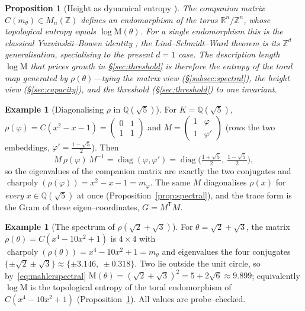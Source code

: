 \documentclass[11pt]{article}
\theoremstyle{plain}
\newtheorem{proposition}[theorem]{Proposition}
\theoremstyle{definition}
\newtheorem{example}[theorem]{Example}
\theoremstyle{remark}
\newcommand{\Q}{\mathbb{Q}}
\newcommand{\Z}{\mathbb{Z}}
\newcommand{\R}{\mathbb{R}}
\newcommand{\K}{K}
\newcommand{\charpoly}{\operatorname{charpoly}}
\newcommand{\Mah}{\mathrm{M}}
\newcommand{\GG}{G}
\newcommand{\transpose}{^{\mathsf{T}}}
\newcommand{\inv}{^{-1}}
\DeclareMathOperator{\diag}{diag}
\begin{document}
\begin{proposition}[Height as dynamical entropy {\cite{Yuzvinskii,LSW}}]\label{prop:lsw}
The companion matrix $C(m_\theta)\in M_n(\Z)$ defines an endomorphism of the torus $\R^n/\Z^n$, whose
topological entropy equals $\log\Mah(\theta)$. For a single endomorphism this is the classical
Yuzvinskii--Bowen identity \cite{Yuzvinskii}; the Lind--Schmidt--Ward theorem \cite{LSW} is its $\Z^d$
generalisation, specialising to the present $d=1$ case. The description length $\log\Mah$ that prices growth
in \S\ref{sec:threshold} is therefore the entropy of the toral map generated by $\rho(\theta)$---tying the
matrix view (\S\ref{subsec:spectral}), the height view (\S\ref{sec:capacity}), and the threshold
(\S\ref{sec:threshold}) to one invariant.
\end{proposition}

\begin{example}[Diagonalising $\rho$ in $\Q(\sqrt5)$]\label{ex:spectral}
For $\K=\Q(\sqrt5)$, $\rho(\varphi)=C(x^2-x-1)=\left(\begin{smallmatrix}0&1\\1&1\end{smallmatrix}\right)$ and
$M=\left(\begin{smallmatrix}1&\varphi\\1&\varphi'\end{smallmatrix}\right)$ (rows the two embeddings, $\varphi'=\tfrac{1-\sqrt5}2$). Then
\[
  M\,\rho(\varphi)\,M\inv=\diag(\varphi,\varphi')=\diag\!\Big(\tfrac{1+\sqrt5}2,\ \tfrac{1-\sqrt5}2\Big),
\]
so the eigenvalues of the companion matrix are exactly the two conjugates and
$\charpoly(\rho(\varphi))=x^2-x-1=m_\varphi$. The same $M$ diagonalises $\rho(x)$ for \emph{every}
$x\in\Q(\sqrt5)$ at once (Proposition~\ref{prop:spectral}), and the trace form is the Gram of these
eigen--coordinates, $\GG=M\transpose M$.
\end{example}

\begin{example}[The spectrum of $\rho(\sqrt2+\sqrt3)$]\label{ex:spectral4}
For $\theta=\sqrt2+\sqrt3$, the matrix $\rho(\theta)=C(x^4-10x^2+1)$ is $4\times4$ with
$\charpoly(\rho(\theta))=x^4-10x^2+1=m_\theta$ and eigenvalues the four conjugates
$\{\pm\sqrt2\pm\sqrt3\}\approx\{\pm3.146,\ \pm0.318\}$. Two lie outside the unit circle, so
by~\eqref{eq:mahlerspectral} $\Mah(\theta)=(\sqrt2+\sqrt3)^2=5+2\sqrt6\approx9.899$; equivalently $\log\Mah$
is the topological entropy of the toral endomorphism of $C(x^4-10x^2+1)$ (Proposition~\ref{prop:lsw}). All
values are probe--checked.
\end{example}
\end{document}

